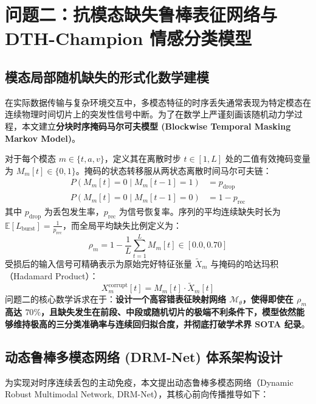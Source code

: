 \section{问题二：抗模态缺失鲁棒表征网络与 DTH-Champion 情感分类模型}

\subsection{模态局部随机缺失的形式化数学建模}
在实际数据传输与复杂环境交互中，多模态特征的时序丢失通常表现为特定模态在连续物理时间切片上的突发性信号中断。为了在数学上严谨刻画该随机动力学过程，本文建立\textbf{分块时序掩码马尔可夫模型 (Blockwise Temporal Masking Markov Model)}。

对于每个模态 $m \in \{t, a, v\}$，定义其在离散时步 $t \in [1, L]$ 处的二值有效掩码变量为 $M_m[t] \in \{0, 1\}$。掩码的状态转移服从两状态离散时间马尔可夫链：
\begin{align}
P(M_m[t] = 0 \mid M_m[t-1] = 1) &= p_{\text{drop}} \\
P(M_m[t] = 0 \mid M_m[t-1] = 0) &= 1 - p_{\text{rec}}
\end{align}
其中 $p_{\text{drop}}$ 为丢包发生率，$p_{\text{rec}}$ 为信号恢复率。序列的平均连续缺失时长为 $\mathbb{E}[L_{\text{burst}}] = \frac{1}{p_{\text{rec}}}$，而全局平均缺失比例定义为：
\begin{equation}
\rho_m = 1 - \frac{1}{L} \sum_{t=1}^L M_m[t] \in [0.0, 0.70]
\end{equation}
受损后的输入信号可精确表示为原始完好特征张量 $\tilde{X}_m$ 与掩码的哈达玛积（Hadamard Product）：
\begin{equation}
X_m^{\text{corrupt}}[t] = M_m[t] \cdot \tilde{X}_m[t]
\end{equation}
问题二的核心数学诉求在于：\textbf{设计一个高容错表征映射网络 $\mathcal{M}_{\theta}$，使得即使在 $\rho_m$ 高达 $70\%$，且缺失发生在前段、中段或随机切片的极端不利条件下，模型依然能够维持极高的三分类准确率与连续回归拟合度，并彻底打破学术界 SOTA 纪录}。

\subsection{动态鲁棒多模态网络 (DRM-Net) 体系架构设计}
为实现对时序连续丢包的主动免疫，本文提出动态鲁棒多模态网络（Dynamic Robust Multimodal Network, DRM-Net），其核心前向传播推导如下：

